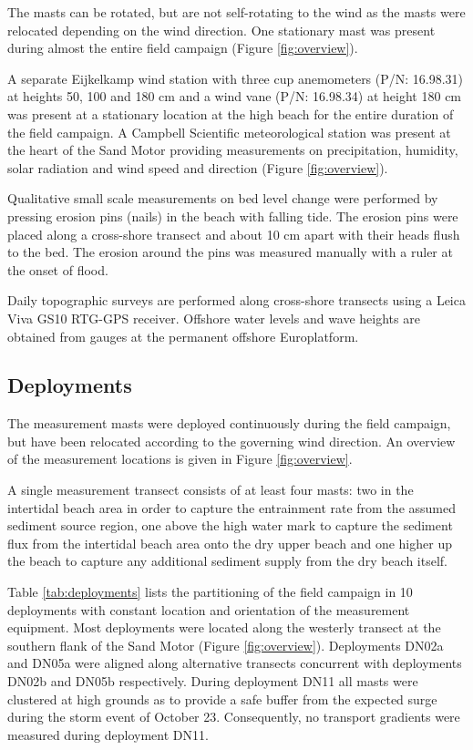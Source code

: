 The masts can be rotated, but are not self-rotating to the wind as the
masts were relocated depending on the wind direction.  One stationary
mast was present during almost the entire field campaign (Figure
\ref{fig:overview}).

A separate Eijkelkamp wind station with three cup anemometers (P/N:
16.98.31) at heights 50, 100 and 180 cm and a wind vane (P/N:
16.98.34) at height 180 cm was present at a stationary location at the
high beach for the entire duration of the field campaign. A Campbell
Scientific meteorological station was present at the heart of the Sand
Motor providing measurements on precipitation, humidity, solar
radiation and wind speed and direction (Figure \ref{fig:overview}).

Qualitative small scale measurements on bed level change were
performed by pressing erosion pins (nails) in the beach with falling
tide. The erosion pins were placed along a cross-shore transect and
about 10 cm apart with their heads flush to the bed. The erosion
around the pins was measured manually with a ruler at the onset of
flood.

Daily topographic surveys are performed along cross-shore transects
using a Leica Viva GS10 RTG-GPS receiver. Offshore water levels and
wave heights are obtained from gauges at the permanent offshore
Europlatform.

\subsection{Deployments}

The measurement masts were deployed continuously during the field
campaign, but have been relocated according to the governing wind
direction. An overview of the measurement locations is given in Figure
\ref{fig:overview}. 

A single measurement transect consists of at least four masts: two in
the intertidal beach area in order to capture the entrainment rate
from the assumed sediment source region, one above the high water mark
to capture the sediment flux from the intertidal beach area onto the
dry upper beach and one higher up the beach to capture any additional
sediment supply from the dry beach itself.  

Table \ref{tab:deployments} lists the partitioning of the field
campaign in 10 deployments with constant location and orientation of
the measurement equipment. Most deployments were located along the
westerly transect at the southern flank of the Sand Motor (Figure
\ref{fig:overview}). Deployments DN02a and DN05a were aligned along
alternative transects concurrent with deployments DN02b and DN05b
respectively. During deployment DN11 all masts were clustered at high
grounds as to provide a safe buffer from the expected surge during the
storm event of October 23. Consequently, no transport gradients were
measured during deployment DN11.

